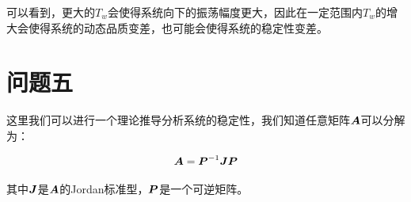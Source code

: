 \documentclass[UTF8]{ctexart}
\begin{document}
可以看到，更大的$T_w$会使得系统向下的振荡幅度更大，因此在一定范围内$T_w$的增大会使得系统的动态品质变差，也可能会使得系统的稳定性变差。

\section{问题五}

这里我们可以进行一个理论推导分析系统的稳定性，我们知道任意矩阵$\boldsymbol{A}$可以分解为：

\begin{equation}
  \boldsymbol{A} = \boldsymbol{P}^{-1} \boldsymbol{J} \boldsymbol{P}
\end{equation}

其中$\boldsymbol{J}$是$\boldsymbol{A}$的Jordan标准型，$\boldsymbol{P}$是一个可逆矩阵。
\end{document}

